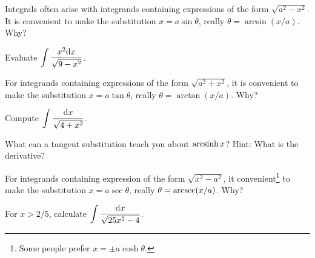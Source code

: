 

\begin{remark}
Integrals often arise with integrands containing expressions of the form $\sqrt{a^2-x^2}$.
It is convenient to make the substitution $x=a\sin\theta$, really $\theta = \arcsin(x/a)$.  
Why?
\end{remark}

\newpage

\begin{example}
Evaluate $\displaystyle\int\frac{x^2\mathrm{d} x}{\sqrt{9-x^2}}$.
\end{example}

\newpage

\begin{remark}
For integrands containing expressions of the form $\sqrt{a^2+x^2}$, it is convenient to make the substitution $x=a\tan\theta$, really $\theta=\arctan(x/a)$.
Why?
\end{remark}

\newpage

\begin{example}
Compute $\displaystyle\int\frac{\mathrm{d} x}{\sqrt{4+x^2}}$.
\end{example}

\newpage

\begin{example}
What can a tangent substitution teach you about $\operatorname{arcsinh} x$?
Hint: What is the derivative?
\end{example}

\newpage

\begin{remark}
For integrands containing expression of the form $\sqrt{x^2-a^2}$, it convenient\footnote{Some people prefer $x=\pm a\cosh\theta$.} to make the substitution $x=a\sec\theta$, really $\theta=\operatorname{arcsec}(x/a)$.
Why?
\end{remark}

\newpage

\begin{example}
For $x>2/5$, calculate $\displaystyle\int\frac{\mathrm{d} x}{\sqrt{25x^2-4}}$.
\end{example}
